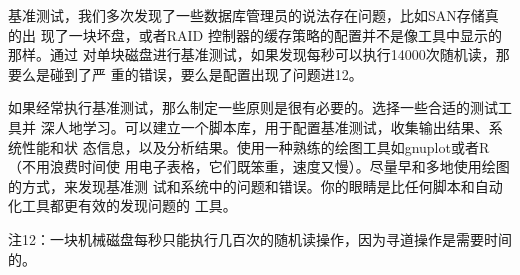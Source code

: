 基准测试，我们多次发现了一些数据库管理员的说法存在问题，比如SAN存储真的出
现了一块坏盘，或者RAID 控制器的缓存策略的配置并不是像工具中显示的那样。通过
对单块磁盘进行基准测试，如果发现每秒可以执行14000次随机读，那要么是碰到了严
重的错误，要么是配置出现了问题进12。

如果经常执行基准测试，那么制定一些原则是很有必要的。选择一些合适的测试工具并
深人地学习。可以建立一个脚本库，用于配置基准测试，收集输出结果、系统性能和状
态信息，以及分析结果。使用一种熟练的绘图工具如gnuplot或者R（不用浪费时间使
用电子表格，它们既笨重，速度又慢）。尽量早和多地使用绘图的方式，来发现基准测
试和系统中的问题和错误。你的眼睛是比任何脚本和自动化工具都更有效的发现问题的
工具。

注12：一块机械磁盘每秒只能执行几百次的随机读操作，因为寻道操作是需要时间的。


